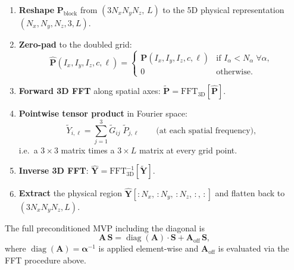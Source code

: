 \documentclass[11pt,a4paper]{article}
\begin{document}
\begin{enumerate}
  \item \textbf{Reshape} $\mathbf{P}_{\text{block}}$ from
        $(3 N_x N_y N_z,\, L)$ to the 5D physical representation
        $(N_x, N_y, N_z, 3, L)$.
  \item \textbf{Zero-pad} to the doubled grid:
        \begin{equation}
          \hat{\mathbf{P}}(I_x, I_y, I_z, c, \ell) =
          \begin{cases}
            \mathbf{P}(I_x, I_y, I_z, c, \ell)
              & \text{if } I_\alpha < N_\alpha \;\forall \alpha, \\
            0 & \text{otherwise}.
          \end{cases}
          \label{eq:zero-pad}
        \end{equation}
  \item \textbf{Forward 3D FFT} along spatial axes:
        $\widetilde{\mathbf{P}} = \mathrm{FFT}_{3\text{D}}[\hat{\mathbf{P}}]$.
  \item \textbf{Pointwise tensor product} in Fourier space:
        \begin{equation}
          \widetilde{Y}_{i,\ell}
            = \sum_{j=1}^{3}
              \widetilde{G}_{ij}\;\widetilde{P}_{j,\ell}
          \qquad
          \text{(at each spatial frequency)},
          \label{eq:fourier-product}
        \end{equation}
        i.e.\ a $3\times 3$ matrix times a $3\times L$ matrix at every
        grid point.
  \item \textbf{Inverse 3D FFT}:
        $\hat{\mathbf{Y}} = \mathrm{FFT}_{3\text{D}}^{-1}[\widetilde{\mathbf{Y}}]$.
  \item \textbf{Extract} the physical region
        $\hat{\mathbf{Y}}[{:}N_x,\, {:}N_y,\, {:}N_z,\, :,\, :]$
        and flatten back to $(3 N_x N_y N_z, L)$.
\end{enumerate}

The full preconditioned MVP including the diagonal is
\begin{equation}
  \mathbf{A}\,\bm{S}
    = \operatorname{diag}(\mathbf{A})\cdot\bm{S}
      + \mathbf{A}_{\text{off}}\,\bm{S},
  \label{eq:full-mvp}
\end{equation}
where $\operatorname{diag}(\mathbf{A}) = \boldsymbol{\alpha}^{-1}$ is applied
element-wise and $\mathbf{A}_{\text{off}}$ is evaluated via the FFT
procedure above.

\end{document}
